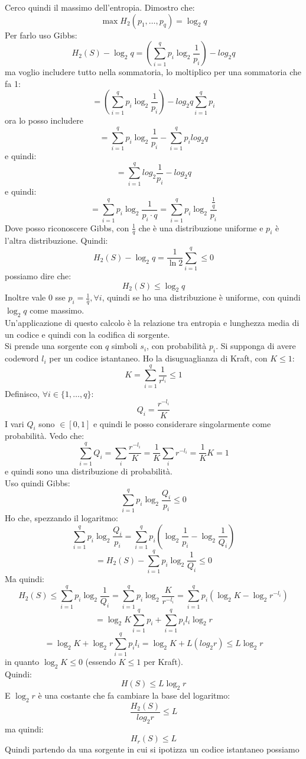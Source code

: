 \documentclass[a4paper,12pt, oneside]{book}
\begin{document}
Cerco quindi il massimo dell'entropia. Dimostro che:
\[\max H_2(p_1,\ldots, p_q)=\log_2 q\]
Per farlo uso Gibbs:
\[H_2(S)-\log_2 q=\left(\sum_{i=1}^q p_i\log_2\frac{1}{p_i}\right)-log_2 q\]
ma voglio includere tutto nella sommatoria, lo moltiplico per una sommatoria che
fa 1:
\[=\left(\sum_{i=1}^q p_i\log_2\frac{1}{p_i}\right)-log_2q \sum_{i=1}^qp_i\]
ora lo posso includere
\[=\sum_{i=1}^q p_i\log_2\frac{1}{p_i}- \sum_{i=1}^qp_i log_2q\]
e quindi:
\[=\sum_{i=1}^qlog_2\frac{1}{p_i}-log_2 q\]
e quindi:
\[=\sum_{i=1}^q p_i\log_2\frac{1}{p_i\cdot q}=\sum_{i=1}^q
  p_i\log_2\frac{\frac{1}{q}}{p_i}\]
Dove posso riconoscere Gibbs, con $\frac{1}{q}$ che è una distribuzione
uniforme e $p_i$ è l'altra distribuzione. Quindi:
\[H_2(S)-\log_2 q=\frac{1}{\ln 2}\sum_{i=1}^q\leq 0\]
possiamo dire che:
\[H_2(S)\leq \log_2 q\]
Inoltre vale 0 sse $p_i=\frac{1}{q},\forall i$, quindi se ho una distribuzione è
uniforme, con quindi $\log_2 q$ come massimo.\\
Un'applicazione di questo calcolo è la relazione tra entropia e lunghezza media
di un codice e quindi con la codifica di sorgente.\\
Si prende una sorgente con $q$ simboli $s_i$, con probabilità $p_i$. Si supponga
di avere codeword $l_i$ per un codice istantaneo. Ho la disuguaglianza di Kraft,
con $K\leq 1$:
\[K=\sum_{i=1}^q\frac{1}{r^{l_i}}\leq 1\]
Definisco, $\forall i\in\{1,\ldots, q\}$:
\[Q_i=\frac{r^{-l_i}}{K}\]
I vari $Q_i$ sono $\in[0,1]$ e quindi le posso considerare singolarmente come
probabilità. Vedo che:
\[\sum_{i=1}^q Q_i=\sum_i \frac{r^{-l_i}}{K} = \frac{1}{K}\sum_i
  r^{-l_i}=\frac{1}{K}K =1\]
e quindi sono una distribuzione di probabilità.\\
Uso quindi Gibbs:
\[\sum_{i=1}^q p_i\log_2\frac{Q_i}{p_i}\leq 0\]
Ho che, spezzando il logaritmo:
\[\sum_{i=1}^q p_i\log_2\frac{Q_i}{p_i}=\sum_{i=1}^qp_i\left(
  \log_2\frac{1}{p_i}-\log_2\frac{1}{Q_i}\right)\]
\[=H_2(S)-\sum_{i=1}^qp_i\log_2\frac{1}{Q_i}\leq 0\]
Ma quindi:
\[H_2(S)\leq  \sum_{i=1}^qp_i\log_2\frac{1}{Q_i}=\sum_{i=1}^qp_i\log_2
  \frac{K}{r^{-l_i}}=\sum_{i=1}^qp_i\left(\log_2K - \log_2 r^{-l_i}\right)\]
\[=\log_2 K\sum_{i=1}^qp_i+\sum_{i=1}^qp_i l_i\log_2 r\]
\[
  =\log_2 K+\log_2 r\sum_{i=1}^qp_i l_i=\log_2 K+L(log_2 r)\leq L\log_2
  r\]
in quanto $\log_2 K\leq 0$ (essendo $K\leq 1$ per Kraft).\\
Quindi:
\[H(S)\leq L\log_2 r\]
E $\log_2 r$ è una costante che fa cambiare la base del logaritmo:
\[\frac{H_2(S)}{log_2 r}\leq L\]
ma quindi:
\[H_r(S)\leq L\]
Quindi partendo da una sorgente in cui si ipotizza un codice istantaneo possiamo
\end{document}
